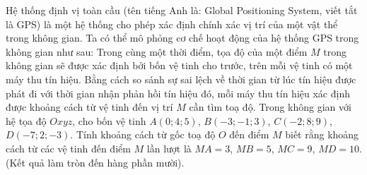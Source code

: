 \begin{ex}%
	Hệ thống định vị toàn cầu (tên tiếng Anh là: Global Positioning System, viết tắt là GPS) là một hệ thống cho phép xác định chính xác vị trí của một vật thể trong không gian. Ta có thể mô phỏng cơ chế hoạt động của hệ thống GPS trong không gian như sau: Trong cùng một thời điểm, tọa độ của một điểm $M$ trong không gian sẽ được xác định bởi bốn vệ tinh cho trước, trên mỗi vệ tinh có một máy thu tín hiệu. Bằng cách so sánh sự sai lệch về thời gian từ lúc tín hiệu được phát đi với thời gian nhận phản hồi tín hiệu đó, mỗi máy thu tín hiệu xác định được khoảng cách từ vệ tinh đến vị trí $M$ cần tìm toạ độ. Trong không gian với hệ tọa độ $Oxyz$, cho bốn vệ tinh $A(0; 4; 5)$, $B(-3;-1; 3)$, $C(-2; 8; 9)$, $D(-7; 2;-3)$. Tính khoảng cách từ gốc toạ độ $O$ đến điểm $M$ biết rằng khoảng cách từ các vệ tinh đến điểm $M$ lần lượt là $MA=3$, $MB=5$, $MC=9$, $MD=10$. (Kết quả làm tròn đến hàng phần mười).
\end{ex}

